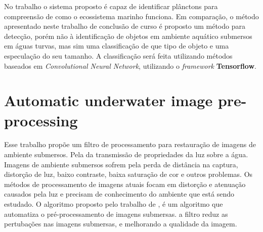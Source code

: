 No trabalho  o sistema proposto é capaz de identificar plânctons para compreensão de como o ecossistema marinho funciona. Em comparação, o método apresentado neste trabalho de conclusão de curso é proposto um método para detecção, porém não à identificação de objetos em ambiente aquático submersos em águas turvas, mas sim uma classificação de que tipo de objeto e uma especulação do seu tamanho. A classificação será feita utilizando métodos baseados em \textit{Convolutional Neural Network}, utilizando o \textit{framework} \textbf{Tensorflow}.

\section{Automatic underwater image pre-processing}
Esse trabalho propõe um filtro de processamento para restauração de imagens de ambiente submersos. Pela da transmissão de propriedades da luz sobre a água. Imagens de ambiente submersos sofrem pela perda de distância na captura, distorção de luz, baixo contraste, baixa saturação de cor e outros problemas. Os métodos de processamento de imagens atuais focam em distorção e atenuação causados pela luz e precisam de conhecimento do ambiente que está sendo estudado. O algoritmo proposto pelo trabalho de \cite{bazeille2006}, é um algoritmo que automatiza o pré-processamento de imagens submersas.  a filtro reduz as pertubações nas imagens submersas, e melhorando a qualidade da imagem.







